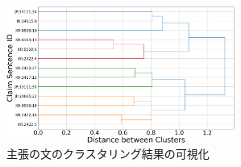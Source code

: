 \documentclass[a4paper, twocolumn, 10pt]{jarticle}
\begin{document}
\begin{figure}[H]
	\centering
	\includegraphics[keepaspectratio, width=75mm]{img/process-07_sentences-cluster_from-cluster-230_with-threshold-85_color_dendrogram_reduced-data-to-5000_y-120_Trim.png}
	\caption{
    主張の文のクラスタリング結果の可視化
  }
	\label{claim_sentences_dendrogram}
\end{figure}
\vspace{-3.0mm}


\end{document}
